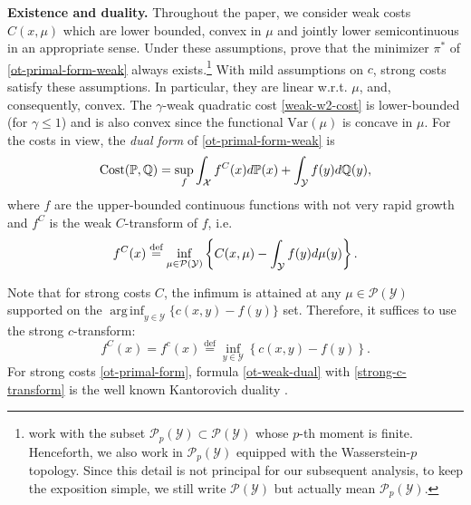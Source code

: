 \documentclass{article} %
\DeclareMathOperator*{\arginf}{arg\,inf}
\begin{document}
\vspace{-1.5mm}\textbf{Existence and duality.} Throughout the paper,  we consider weak costs $C(x,\mu)$ which are lower bounded, convex in $\mu$ and jointly lower semicontinuous in an appropriate
sense. Under these assumptions, \citep{backhoff2019existence} prove that the minimizer $\pi^{*}$ of \eqref{ot-primal-form-weak} always exists.\footnote{\cite{backhoff2019existence} work with the subset ${\mathcal{P}_{p}(\mathcal{Y})\subset \mathcal{P}(\mathcal{Y})}$ whose $p$-th moment is finite. Henceforth, we also work in $\mathcal{P}_{p}(\mathcal{Y})$ equipped with the Wasserstein-$p$ topology. Since this detail is not principal for our subsequent analysis, to keep the exposition simple, we still write $\mathcal{P}(\mathcal{Y})$ but actually mean $\mathcal{P}_{p}(\mathcal{Y})$.} With mild assumptions on $c$, strong costs satisfy these assumptions. In particular, they are linear w.r.t. $\mu$, and, consequently, convex. The $\gamma$-weak quadratic cost \eqref{weak-w2-cost} is lower-bounded (for $\gamma\leq 1$) and is also convex since the functional $\text{Var}(\mu)$ is concave in $\mu$.
For the costs in view, the \textit{dual form} of \eqref{ot-primal-form-weak} is
\begin{equation}
    \text{Cost}(\mathbb{P},\mathbb{Q})=\sup_{f}\int_{\mathcal{X}}f^{C}(x)d\mathbb{P}(x)+\int_{\mathcal{Y}}f(y)d\mathbb{Q}(y),
    \label{ot-weak-dual}
    \vspace{-1mm}
\end{equation}
where $f$ are the upper-bounded continuous functions with not very rapid growth \citep[Equation 1.2]{backhoff2019existence} and $f^{C}$ is the weak $C$-transform of $f$, i.e.
\begin{equation}f^{C}(x)\stackrel{\text{def}}{=}\inf_{\mu\in\mathcal{P}(\mathcal{Y})}\left\lbrace C(x,\mu)-\int_{\mathcal{Y}}f(y)d\mu(y)\right\rbrace.
\label{weak-c-transform}
\vspace{-2mm}
\end{equation}

\vspace{-0.5mm}Note that for strong costs $C$, the infimum is attained at any ${\mu\in\mathcal{P}(\mathcal{Y})}$ supported on the $\arginf_{y\in\mathcal{Y}}\lbrace c(x,y)-f(y)\rbrace$ set. Therefore, it suffices  to use the strong $c$-transform:
\begin{equation}f^{C}(x)= f^{c}(x)\stackrel{\text{def}}{=}\inf_{y\in\mathcal{Y}}\left\lbrace c(x,y)-f(y)\right\rbrace.
\label{strong-c-transform}
\end{equation}
For strong costs \eqref{ot-primal-form}, formula \eqref{ot-weak-dual} with \eqref{strong-c-transform} is the well known Kantorovich duality \citep[]{villani2008optimal}.
\end{document}
